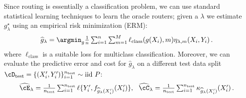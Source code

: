 Since routing is essentially a classification problem, we can use standard statistical learning techniques to learn the oracle routers; given a $\lambda$ we estimate $g_\lambda^\star$ using an empirical risk minimization (ERM): 
\begin{equation} \label{eq:ERM}
  \textstyle  \widehat g_\lambda = \argmin_g \frac1n \sum_{i = 1}^n \sum_{m = 1}^M \ell_{\text{class}}(g(X_i), m) \eta_{\lambda, m}(X_i, Y_i)\,. 
\end{equation} where $\ell_{\text{class}}$ is a suitable loss for multiclass classification. Moreover, we can evaluate the predictive error and cost for  $\widehat g_\lambda$ on a different test data split $\cD_\text{test} = \{(X_i' ,Y_i')\}_{i = 1}^{n_{\text{test}}} \sim  \textrm{iid} ~  P $: 
\begin{equation} \label{eq:perf-cost}
   \textstyle  \widehat \cE_\lambda  =  \frac1{n_\text{test}} \sum_{i = 1}^{n_\text{test}}  \ell\{Y_i', f_{\widehat g_\lambda(X_i')}(X_i')\}, ~~ \widehat \cC _\lambda =  \frac1{n_\text{test}} \sum_{i = 1}^{n_\text{test}}  \kappa_{\widehat g_\lambda(X_i')}(X_i')\,. 
\end{equation}













